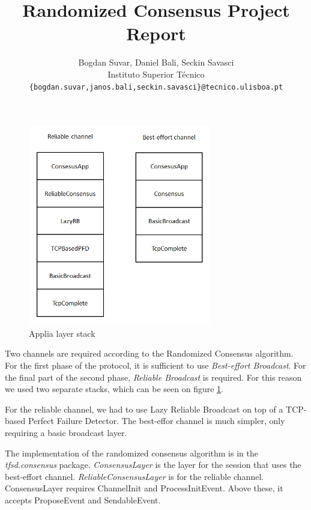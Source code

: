 \documentclass[times, 12pt,twocolumn]{article}
\begin{document}
\title{Randomized Consensus Project Report}

\author{Bogdan Suvar, Daniel Bali, Seckin Savasci\\
Instituto Superior T\'{e}cnico\\
\texttt{\{bogdan.suvar,janos.bali,seckin.savasci\}@tecnico.ulisboa.pt}\\
}
 
\maketitle
\thispagestyle{empty}




\begin{figure}[ht!]
\centering
\includegraphics[width=80mm]{stack.png}
\caption{Applia layer stack}
\label{fig:stack}
\end{figure}

Two channels are required according to the Randomized Consensus algorithm. 
For the first phase of the protocol, it is sufficient to use 
\textit{Best-effort Broadcast}. For the final part of the second phase, 
\textit{Reliable Broadcast} is required. For this reason we used two 
separate stacks, which can be seen on figure \ref{fig:stack}.

For the reliable channel, we had to use Lazy Reliable Broadcast on top
of a TCP-based Perfect Failure Detector. The best-effor channel is much simpler, 
only requiring a basic broadcast layer.

The implementation of the randomized consensus algorithm is in the 
\textit{tfsd.consensus} package. \textit{ConsensusLayer} is the layer for the 
session that uses the best-effort channel. \textit{ReliableConsensusLayer} is for 
the reliable channel. ConsensusLayer requires ChannelInit and ProcessInitEvent. 
Above these, it accepts ProposeEvent and SendableEvent.
\end{document}
